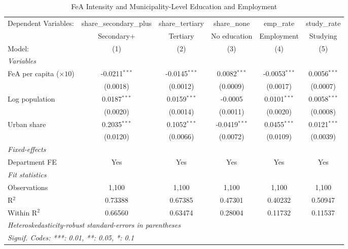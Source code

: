 
\begin{table}[htbp]
   \caption{\label{tab:outcomes} FeA Intensity and Municipality-Level Education and Employment}
   \centering
   \begin{adjustbox}{max width=\textwidth}\begin{tabular}{lccccc}
      \tabularnewline \midrule \midrule
      Dependent Variables:          & share\_secondary\_plus   & share\_tertiary  & share\_none     & emp\_rate       & study\_rate\\   
                                    & Secondary+               & Tertiary         & No education    & Employment      & Studying \\   
      Model:                        & (1)                      & (2)              & (3)             & (4)             & (5)\\  
      \midrule
      \emph{Variables}\\
      FeA per capita ($\times 10$)  & -0.0211$^{***}$          & -0.0145$^{***}$  & 0.0082$^{***}$  & -0.0053$^{***}$ & 0.0056$^{***}$\\   
                                    & (0.0018)                 & (0.0012)         & (0.0009)        & (0.0017)        & (0.0007)\\   
      Log population                & 0.0187$^{***}$           & 0.0159$^{***}$   & -0.0005         & 0.0101$^{***}$  & 0.0058$^{***}$\\   
                                    & (0.0020)                 & (0.0014)         & (0.0011)        & (0.0020)        & (0.0008)\\   
      Urban share                   & 0.2035$^{***}$           & 0.1052$^{***}$   & -0.0419$^{***}$ & 0.0455$^{***}$  & 0.0121$^{***}$\\   
                                    & (0.0120)                 & (0.0066)         & (0.0072)        & (0.0109)        & (0.0039)\\   
      \midrule
      \emph{Fixed-effects}\\
      Department FE                 & Yes                      & Yes              & Yes             & Yes             & Yes\\  
      \midrule
      \emph{Fit statistics}\\
      Observations                  & 1,100                    & 1,100            & 1,100           & 1,100           & 1,100\\  
      R$^2$                         & 0.73388                  & 0.67385          & 0.47301         & 0.40232         & 0.50947\\  
      Within R$^2$                  & 0.66560                  & 0.63474          & 0.28004         & 0.11732         & 0.11537\\  
      \midrule \midrule
      \multicolumn{6}{l}{\emph{Heteroskedasticity-robust standard-errors in parentheses}}\\
      \multicolumn{6}{l}{\emph{Signif. Codes: ***: 0.01, **: 0.05, *: 0.1}}\\
   \end{tabular}\end{adjustbox}
   

\end{table}
